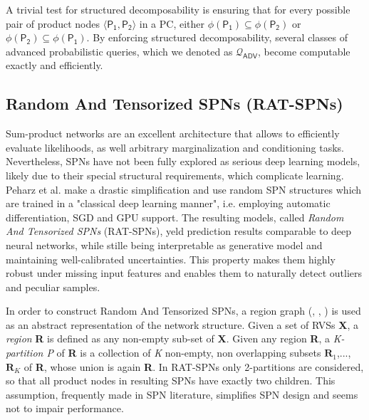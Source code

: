 \noindent A trivial test for structured decomposability is ensuring that for every possible pair of product nodes $\langle \mathsf{P_1}, \mathsf{P_2} \rangle$ in a PC, either $\phi(\mathsf{P_1}) \subseteq \phi(\mathsf{P_2})$ or $\phi(\mathsf{P_2}) \subseteq \phi(\mathsf{P_1})$.
By enforcing structured decomposability, several classes of advanced probabilistic queries, which we denoted as $\boldsymbol{\mathcal{Q}}_{\mathsf{ADV}}$, become computable exactly and efficiently. 

\subsection{Random And Tensorized SPNs (RAT-SPNs)}
\label{rat-spn}
Sum-product networks are an excellent architecture that allows to efficiently evaluate likelihoods, as well arbitrary marginalization and conditioning tasks. Nevertheless, SPNs have not been fully explored as serious deep learning models, likely due to their special structural requirements, which complicate learning. Peharz et al. \cite{DBLP:journals/corr/abs-1806-01910} make a drastic simplification and use random SPN structures which are trained in a "classical deep learning manner", i.e. employing automatic differentiation, SGD and GPU support. The resulting models, called \textit{Random And Tensorized SPNs} (RAT-SPNs), yeld prediction results comparable to deep neural networks, while stille being interpretable as generative model and maintaining well-calibrated uncertainties. This property makes them highly robust under missing input features and enables them to naturally detect outliers and peculiar samples.

In order to construct Random And Tensorized SPNs, a region graph (\cite{poon2011sum}, \cite{pmlr-v28-gens13}, \cite{10.1007/978-3-642-40991-2_39}) is used as an abstract representation of the network structure. Given a set of RVSs \textbf{X}, a  \textit{region} \textbf{R} is defined as any non-empty sub-set of \textbf{X}. Given any region \textbf{R}, a  \textit{K-partition P} of \textbf{R} is a collection of \textit{K} non-empty, non overlapping subsets $\mathbf{R}_1$,...,$\mathbf{R}_K$ of \textbf{R}, whose union is again \textbf{R}. In RAT-SPNs only 2-partitions are considered, so that all product nodes in resulting SPNs have exactly two children. This assumption, frequently made in SPN literature, simplifies SPN design and seems not to impair performance.

